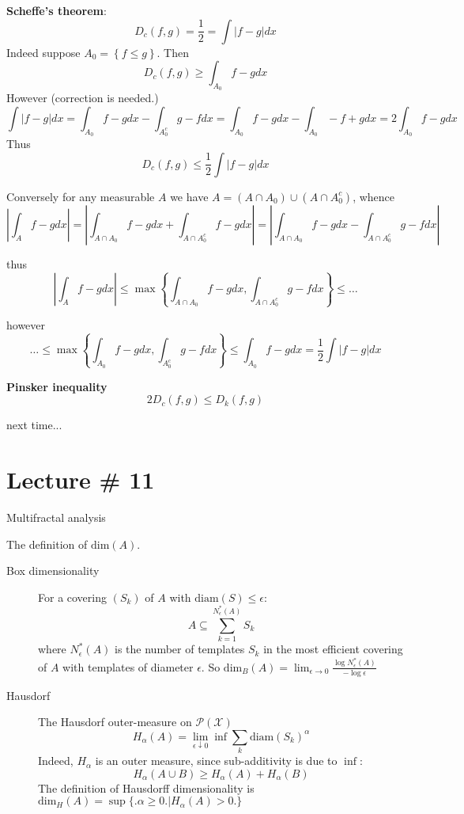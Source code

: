\documentclass[a4paper]{article}
\newcommand{\obj}[1]{{\left\{ #1 \right \}}}
\newcommand{\abs}[1]{{\left | #1 \right |}}
\newcommand{\Xcal}{\mathcal{X}}
\begin{document}
\noindent\textbf{Scheffe's theorem}:
\[D_c(f,g) = \frac{1}{2} = \int \abs{f-g}dx\]
Indeed suppose $A_0 = \obj{ f\leq g }$. Then
\[D_c(f,g)\geq \int_{A_0} f-g dx\]
However (correction is needed.)
\[\int \abs{f-g} dx = \int_{A_0} f-g dx - \int_{A_0^c} g-f dx = \int_{A_0} f-g dx  - \int_{A_0} -f+g dx = 2\int_{A_0} f-g dx \]
Thus 
\[D_c(f,g)\leq \frac{1}{2} \int \abs{f-g} dx \]

Conversely for any measurable $A$ we have $A = (A\cap A_0) \cup (A\cap A_0^c)$, whence
\[\abs{\int_A f-g dx} = \abs{\int_{A\cap A_0} f-g dx + \int_{A\cap A_0^c} f-g dx} = \abs{\int_{A\cap A_0} f-g dx - \int_{A\cap A_0^c} g-f dx}\]

thus 
\[\abs{\int_A f-g dx} \leq \max\obj{ \int_{A\cap A_0} f-g dx, \int_{A\cap A_0^c} g-f dx } \leq \ldots\]

however
\[\ldots \leq \max\obj{ \int_{A_0} f-g dx, \int_{A_0^c} g-f dx } \leq \int_{A_0} f-g dx  = \frac{1}{2}\int \abs{f-g} dx\]

\noindent\textbf{Pinsker inequality}\hfill \\
\[2 D_c(f,g) \leq D_k(f,g)\]

next time...



\section{Lecture \# 11} %
\label{sec:lecture_11}

Multifractal analysis

The definition of $\text{dim}(A)$.
\begin{description}
	\item[Box dimensionality] For a covering $(S_k)$ of $A$ with $\text{diam}(S)\leq \epsilon$:
	\[A \subseteq \sum_{k=1}^{N^*_\epsilon(A)} S_k \]
	where $N^*_\epsilon(A)$ is the number of templates $S_k$ in the most efficient covering of $A$ with templates of diameter $\epsilon$.
	So $\text{dim}_B(A) = \lim_{\epsilon \to 0} \frac{\log N^*_\epsilon(A)}{-\log \epsilon}$
	\item[Hausdorf] The Hausdorf outer-measure on $\mathcal{P}(\Xcal)$
	\[H_\alpha(A) = \lim_{\epsilon\downarrow 0} \inf \sum_k \text{diam}(S_k)^\alpha\]
	Indeed, $H_\alpha$ is an outer measure, since sub-additivity is due to $\inf$: \[H_\alpha(A\cup B) \geq H_\alpha(A)+H_\alpha(B)\]
	The definition of Hausdorff dimensionality is
	$\text{dim}_H(A) = \sup\big\{\big. \alpha\geq 0\big.\big\rvert H_\alpha(A) > 0 \big.\big\}$
\end{description}
\end{document}
